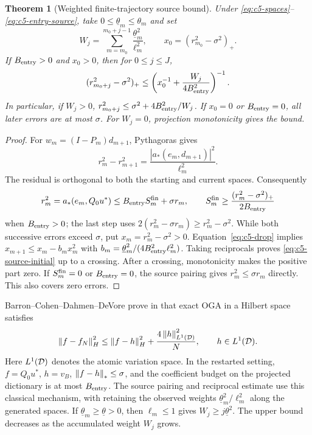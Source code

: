 \documentclass[11pt]{article}
\newtheorem{theorem}{Theorem}[section]
\theoremstyle{remark}
\begin{document}
\begin{theorem}[Weighted finite-trajectory source bound]
\label{thm:c5-source}
Under \eqref{eq:c5-spaces}--\eqref{eq:c5-entry-source}, take
$0\leq\underline\theta_m\leq\theta_m$ and set
\[
 W_j=\sum_{m=m_0}^{m_0+j-1}\frac{\underline\theta_m^2}{\ell_m^2},
 \qquad x_0=(r_{m_0}^2-\sigma^2)_+ .
\]
If $B_{\rm entry}>0$ and $x_0>0$, then for $0\leq j\leq J$,
\begin{equation}
 (r_{m_0+j}^2-\sigma^2)_+
 \leq\left(x_0^{-1}+\frac{W_j}{4B_{\rm entry}^2}\right)^{-1}.
 \label{eq:c5-source-initial}
\end{equation}
In particular, if $W_j>0$,
$r_{m_0+j}^2\leq\sigma^2+4B_{\rm entry}^2/W_j$.
If $x_0=0$ or $B_{\rm entry}=0$, all later errors are at most $\sigma$.
For $W_j=0$, projection monotonicity gives the bound.
\end{theorem}
\begin{proof}
For $w_m=(I-P_m)d_{m+1}$, Pythagoras gives
\begin{equation}
 r_m^2-r_{m+1}^2
 =\frac{|a_*(e_m,d_{m+1})|^2}{\ell_m^2}.
 \label{eq:c5-drop}
\end{equation}
The residual is orthogonal to both the starting and current spaces.
Consequently
\[
 r_m^2=a_*(e_m,Q_0u^*)\leq B_{\rm entry}S_m^{\rm fin}+\sigma r_m,
 \qquad
 S_m^{\rm fin}\geq\frac{(r_m^2-\sigma^2)_+}{2B_{\rm entry}}
\]
when $B_{\rm entry}>0$; the last step uses
$2(r_m^2-\sigma r_m)\geq r_m^2-\sigma^2$.
While both successive errors exceed $\sigma$, put
$x_m=r_m^2-\sigma^2>0$. Equation~\eqref{eq:c5-drop} implies
$x_{m+1}\leq x_m-b_mx_m^2$ with
$b_m=\underline\theta_m^2/(4B_{\rm entry}^2\ell_m^2)$.
Taking reciprocals proves \eqref{eq:c5-source-initial} up to a crossing.
After a crossing, monotonicity makes the positive part zero.
If $S_m^{\rm fin}=0$ or $B_{\rm entry}=0$, the source pairing gives
$r_m^2\leq\sigma r_m$ directly. This also covers zero errors.
\end{proof}

Barron--Cohen--Dahmen--DeVore prove in
\cite[Theorem~2.3, equation~(2.31)]{BarronCohenDahmenDeVore2008}
that exact OGA in a Hilbert space satisfies
\begin{equation}
 \left\lVert f-f_N\right\rVert_H^2\leq\left\lVert f-h\right\rVert_H^2+
            \frac{4\left\lVert h\right\rVert_{L^1(\mathcal D)}^2}{N},\qquad h\in L^1(\mathcal D).
 \label{eq:c5-barron}
\end{equation}
Here \(L^1(\mathcal D)\) denotes the atomic variation space. In the restarted setting, \(f=Q_0u^*\), \(h=v_B\), \(\left\lVert f-h\right\rVert_*\le\sigma\), and the coefficient budget on the projected dictionary is at most \(B_{\rm entry}\). The source pairing and reciprocal estimate use this classical mechanism, with  retaining the observed weights \(\underline\theta_m^2/\ell_m^2\) along the generated spaces.
If $\underline\theta_m\geq\underline\theta>0$, then $\ell_m\leq1$
gives $W_j\geq j\underline\theta^2$.
The upper bound decreases as the accumulated weight $W_j$ grows.
\end{document}
